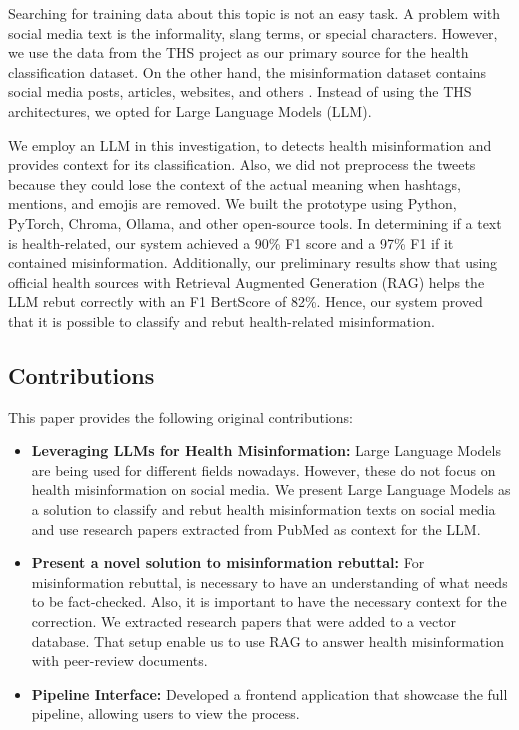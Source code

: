 Searching for training data about this topic is not an easy task. A problem with social media text is the informality, slang terms, or special characters. However, we use the
data from the THS project as our primary source for the health classification dataset. On the other hand, the misinformation dataset contains social media posts, articles,
websites, and others \cite{stephencrone2022,coviddata,covidunesco}. Instead of using the THS architectures, we opted for Large Language Models (LLM). 

We employ an LLM in this investigation, to detects health misinformation and provides context for its classification. Also, we did not preprocess the tweets because they could lose the context of the actual meaning when hashtags, mentions, and emojis are removed. We built the prototype using Python, PyTorch, Chroma, Ollama, and other open-source tools. In determining if a text is health-related, our system achieved a 90\% F1 score and a 97\% F1 if it contained misinformation. Additionally, our preliminary results show that using official health sources with Retrieval Augmented Generation (RAG) helps the LLM rebut correctly with an F1 BertScore of 82\%. Hence, our system proved that it is possible to classify and rebut health-related misinformation. 

\subsection{Contributions}
This paper provides the following original contributions:
\begin{itemize}
	\item{\textbf{Leveraging LLMs for Health Misinformation:}} Large Language Models are being used for different fields nowadays. However, these do not focus on health misinformation on social media. We present Large Language Models as a solution to classify and rebut health misinformation texts on social media and use research papers extracted from PubMed as context for the LLM.
	\item{\textbf{Present a novel solution to misinformation rebuttal:}} For misinformation rebuttal, is necessary to have an understanding of what needs to be fact-checked. Also, it is important to have the necessary context for the correction. We extracted research papers that were added to a vector database. That setup enable us to use RAG to answer health misinformation with peer-review documents.
	\item{\textbf{Pipeline Interface:}} Developed a frontend application that showcase the full pipeline, allowing users to view the process.

\end{itemize}


